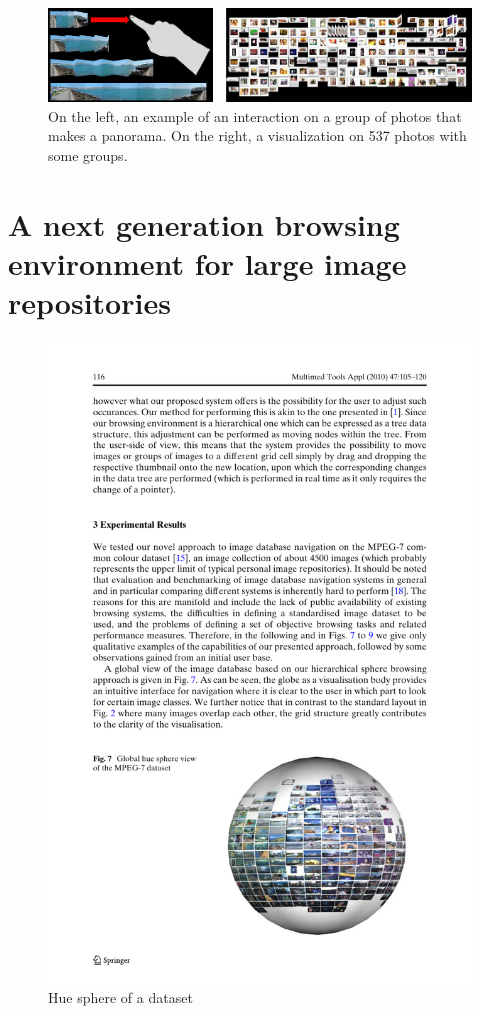 \begin{figure}[ht]
	\centering
		\includegraphics[width=\textwidth]{imgs-RelatedWork/hsu.png}
	\caption{On the left, an example of an interaction on a group of photos that makes a panorama. On the right, a visualization on 537 photos with some groups.}
	\label{fig:hsu1}
\end{figure}



\section{A next generation browsing environment for large image repositories} %
\label{sub:Schaefer}

\begin{figure}[ht]
	\centering
		\includegraphics[scale=1]{imgs-RelatedWork/shaefer1.pdf}
	\caption{Hue sphere of a dataset}
	\label{fig:schaefer1}
\end{figure}

